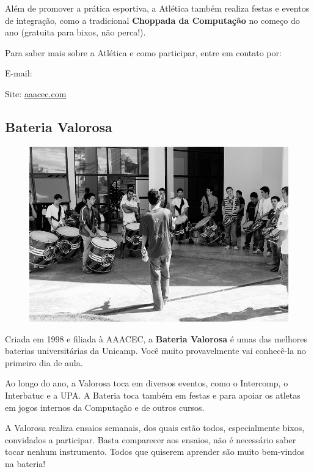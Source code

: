 Além de promover a prática esportiva, a Atlética também realiza festas e eventos
de integração, como a tradicional \textbf{Choppada da Computação} no começo do
ano (gratuita para bixos, não perca!).

Para saber mais sobre a Atlética e como participar, entre em contato por:

\begin{compactitemize}
\item  E-mail: 
\item  Site: \url{aaacec.com}
\end{compactitemize}

\subsection{Bateria Valorosa}

\begin{figure}[H]
    \centering
    \includegraphics[scale=0.27]{img/alem_da_graduacao/valorosa_foto1.jpg}
\end{figure}

Criada em 1998 e filiada à AAACEC, a \textbf{Bateria Valorosa} é umas das
melhores baterias universitárias da Unicamp. Você muito provavelmente vai
conhecê-la no primeiro dia de aula.

Ao longo do ano, a Valorosa toca em diversos eventos, como o Intercomp, o
Interbatuc e a UPA. A Bateria toca também em festas e para apoiar os atletas em
jogos internos da Computação e de outros cursos.

A Valorosa realiza ensaios semanais, dos quais estão todos, especialmente bixos,
convidados a participar. Basta comparecer aos ensaios, não é necessário saber
tocar nenhum instrumento. Todos que quiserem aprender são muito bem-vindos na
bateria!

